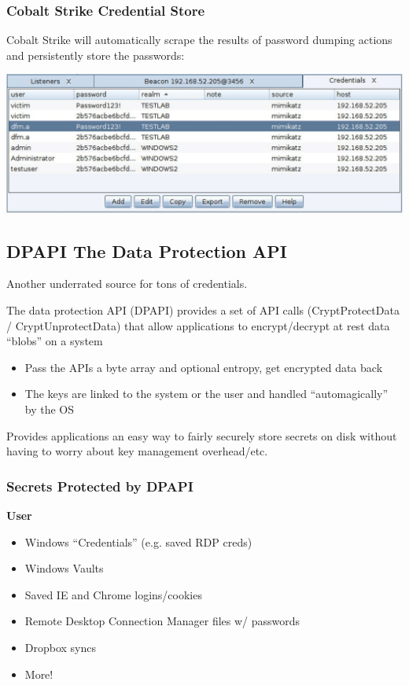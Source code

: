 \subsubsection*{Cobalt Strike Credential Store}
Cobalt Strike will automatically scrape the results of password dumping actions and persistently store the passwords:
\begin{center}
    \includegraphics[width=\textwidth]{resources/11-cobalt-strike-credential-store.png}
\end{center}

\subsection{DPAPI The Data Protection API}
Another underrated source for tons of credentials.

The data protection API (DPAPI) provides a set of API calls (CryptProtectData / CryptUnprotectData) that allow applications to encrypt/decrypt at rest data “blobs” on a system
\begin{itemize}
    \item Pass the APIs a byte array and optional entropy, get encrypted data back
    \item The keys are linked to the system or the user and handled “automagically” by the OS
\end{itemize}
Provides applications an easy way to fairly securely store secrets on disk without having to worry about key management overhead/etc.

\subsubsection*{Secrets Protected by DPAPI}

\textbf{User}
\begin{itemize}
    \item Windows “Credentials” (e.g. saved RDP creds)
    \item Windows Vaults
    \item Saved IE and Chrome logins/cookies
    \item Remote Desktop Connection Manager files w/ passwords
    \item Dropbox syncs
    \item More!
\end{itemize}

